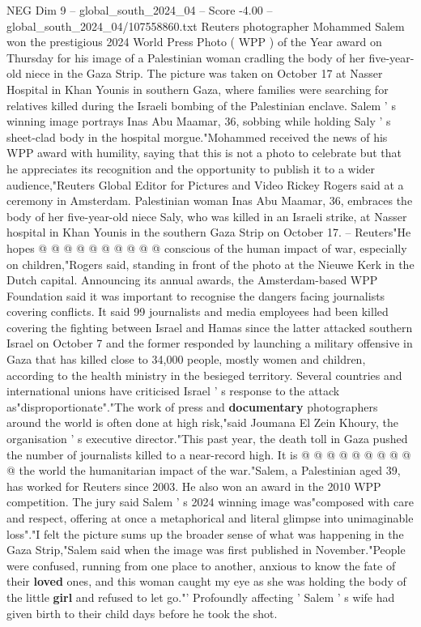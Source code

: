 \begin{textsample}{NEG Dim 9 – global\_south\_2024\_04 – Score -4.00 – global\_south\_2024\_04/107558860.txt}  \label{ex:f9_neg_329}
Reuters photographer Mohammed Salem won the prestigious 2024 World Press Photo ( WPP ) of the Year award on Thursday for his image of a Palestinian woman cradling the body of her five-year-old niece in the Gaza Strip.
The picture was taken on October 17 at Nasser Hospital in Khan Younis in southern Gaza, where families were searching for relatives killed during the Israeli bombing of the Palestinian enclave.
Salem ' s winning image portrays Inas Abu Maamar, 36, sobbing while holding Saly ' s sheet-clad body in the hospital morgue."Mohammed received the news of his WPP award with humility, saying that this is not a photo to celebrate but that he appreciates its recognition and the opportunity to publish it to a wider audience,"Reuters Global Editor for Pictures and Video Rickey Rogers said at a ceremony in Amsterdam.
Palestinian woman Inas Abu Maamar, 36, embraces the body of her five-year-old niece Saly, who was killed in an Israeli strike, at Nasser hospital in Khan Younis in the southern Gaza Strip on October 17. -- Reuters"He hopes @ @ @ @ @ @ @ @ @ @ conscious of the human impact of war, especially on children,"Rogers said, standing in front of the photo at the Nieuwe Kerk in the Dutch capital.
Announcing its annual awards, the Amsterdam-based WPP Foundation said it was important to recognise the dangers facing journalists covering conflicts.
It said 99 journalists and media employees had been killed covering the fighting between Israel and Hamas since the latter attacked southern Israel on October 7 and the former responded by launching a military offensive in Gaza that has killed close to 34,000 people, mostly women and children, according to the health ministry in the besieged territory.
Several countries and international unions have criticised Israel ' s response to the attack as"disproportionate"."The work of press and \textbf{documentary} photographers around the world is often done at high risk,"said Joumana El Zein Khoury, the organisation ' s executive director."This past year, the death toll in Gaza pushed the number of journalists killed to a near-record high.
It is @ @ @ @ @ @ @ @ @ @ the world the humanitarian impact of the war."Salem, a Palestinian aged 39, has worked for Reuters since 2003.
He also won an award in the 2010 WPP competition.
The jury said Salem ' s 2024 winning image was"composed with care and respect, offering at once a metaphorical and literal glimpse into unimaginable loss"."I felt the picture sums up the broader sense of what was happening in the Gaza Strip,"Salem said when the image was first published in November."People were confused, running from one place to another, anxious to know the fate of their \textbf{loved} ones, and this woman caught my eye as she was holding the body of the little \textbf{girl} and refused to let go."' Profoundly affecting ' Salem ' s wife had given birth to their child days before he took the shot.

\end{textsample}
